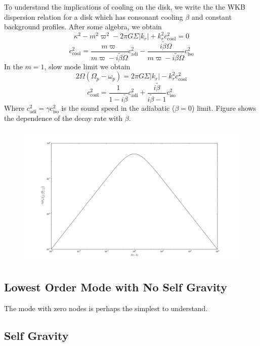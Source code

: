 \documentclass[apj]{emulateapj}
\begin{document}
To understand the implications of cooling on the disk, we write the the WKB dispersion relation for a disk which has consonant cooling $\beta$ and constant background profiles. After some algebra, we obtain
\begin{equation}
 \kappa^2  - m^2 \varpi^2 - 2 \pi G \Sigma |k_r| + k_r^2 c_\text{cool}^2= 0
\end{equation}
\begin{equation}
c_\text{cool}^2 =  \frac{ m \varpi}{ m \varpi - i \tilde{\beta} \Omega} c_\text{adi}^2 - \frac{ i \tilde{\beta} \Omega }{ m \varpi - i \tilde{\beta} \Omega} c_\text{iso}^2
\end{equation}
In the $m=1$, slow mode limit we obtain
\begin{equation}
2 \Omega ( \Omega_p - \omega_p) = 2 \pi G \Sigma |k_r| - k_r^2 c_\text{cool}^2  
\end{equation}
\begin{equation}
c_\text{cool}^2 = \frac{1}{1 - i \tilde{\beta}} c_\text{adi}^2 + \frac{ i \tilde{\beta}}{i \tilde{\beta} -1 } c_\text{iso}^2
\end{equation}
Where $c_\text{adi}^2 = \gamma c_\text{iso}^2$ is the sound speed in the adiabatic ($\beta = 0$) limit. Figure  shows the dependence of the decay rate with $\beta$. 

\begin{figure}[h]
\includegraphics[width=.5\textwidth]{growth_wkb}
\caption{}
\end{figure}







\subsection{Lowest Order Mode with No Self Gravity}
The mode with zero nodes is perhaps the simplest to understand. 




\subsection{Self Gravity}
\end{document}
